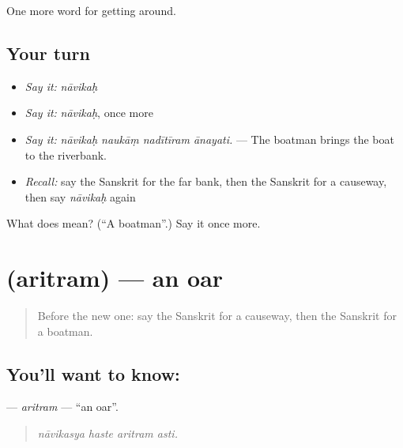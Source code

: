 \begin{grammarlens}[title={What you've built}]
One more word for getting around.
\end{grammarlens}

\subsection*{Your turn}
\begin{itemize}
\raggedright
  \item \emph{Say it:} \emph{nāvikaḥ}
  \item \emph{Say it:} \emph{nāvikaḥ}, once more
  \item \emph{Say it:} \emph{nāvikaḥ naukāṃ nadītīram ānayati.} — The boatman brings the boat to the riverbank.
  \item \emph{Recall:} say the Sanskrit for the far bank, then the Sanskrit for a causeway, then say \emph{nāvikaḥ} again
\end{itemize}

\begin{tcolorbox}[breakable,colback=teal!4,colframe=teal!35!black,title={Before you move on}]
What does  mean? (\textquotedblleft{}A boatman\textquotedblright{}.) Say it once more.
\end{tcolorbox}
\section[\texorpdfstring{\sk{अरित्रम्} (aritram)}{अरित्रम् (aritram)}]{ (aritram) — an oar}

\label{lesson:SA-C416-aritram}



\begin{quote}
Before the new one: say the Sanskrit for a causeway, then the Sanskrit for a boatman.
\end{quote}

\subsection*{You'll want to know: }
\textbf{} — \emph{aritram} — \textquotedblleft{}an oar\textquotedblright{}.

\begin{quote}
   
\end{quote}

\begin{quote}
\emph{nāvikasya haste aritram asti.}
\end{quote}

